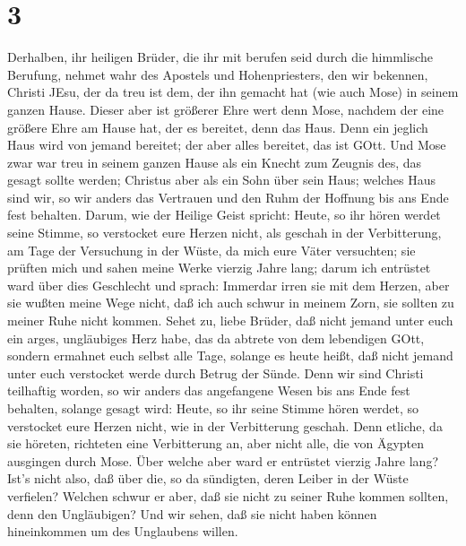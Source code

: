 \hypertarget{section-1}{%
\section{3}\label{section-1}}

 Derhalben, ihr heiligen Brüder, die ihr mit berufen seid
durch die himmlische Berufung, nehmet wahr des Apostels und
Hohenpriesters, den wir bekennen, Christi JEsu,  der da treu
ist dem, der ihn gemacht hat (wie auch Mose) in seinem ganzen Hause.
 Dieser aber ist größerer Ehre wert denn Mose, nachdem der
eine größere Ehre am Hause hat, der es bereitet, denn das Haus.
 Denn ein jeglich Haus wird von jemand bereitet; der aber
alles bereitet, das ist GOtt.  Und Mose zwar war treu in
seinem ganzen Hause als ein Knecht zum Zeugnis des, das gesagt sollte
werden;  Christus aber als ein Sohn über sein Haus; welches
Haus sind wir, so wir anders das Vertrauen und den Ruhm der Hoffnung bis
ans Ende fest behalten.  Darum, wie der Heilige Geist
spricht: Heute, so ihr hören werdet seine Stimme,  so
verstocket eure Herzen nicht, als geschah in der Verbitterung, am Tage
der Versuchung in der Wüste,  da mich eure Väter versuchten;
sie prüften mich und sahen meine Werke vierzig Jahre lang; 
darum ich entrüstet ward über dies Geschlecht und sprach: Immerdar irren
sie mit dem Herzen, aber sie wußten meine Wege nicht,  daß
ich auch schwur in meinem Zorn, sie sollten zu meiner Ruhe nicht kommen.
 Sehet zu, liebe Brüder, daß nicht jemand unter euch ein
arges, ungläubiges Herz habe, das da abtrete von dem lebendigen GOtt,
 sondern ermahnet euch selbst alle Tage, solange es heute
heißt, daß nicht jemand unter euch verstocket werde durch Betrug der
Sünde.  Denn wir sind Christi teilhaftig worden, so wir
anders das angefangene Wesen bis ans Ende fest behalten, 
solange gesagt wird: Heute, so ihr seine Stimme hören werdet, so
verstocket eure Herzen nicht, wie in der Verbitterung geschah.
 Denn etliche, da sie höreten, richteten eine Verbitterung
an, aber nicht alle, die von Ägypten ausgingen durch Mose. 
Über welche aber ward er entrüstet vierzig Jahre lang? Ist's nicht also,
daß über die, so da sündigten, deren Leiber in der Wüste verfielen?
 Welchen schwur er aber, daß sie nicht zu seiner Ruhe
kommen sollten, denn den Ungläubigen?  Und wir sehen, daß
sie nicht haben können hineinkommen um des Unglaubens willen.

